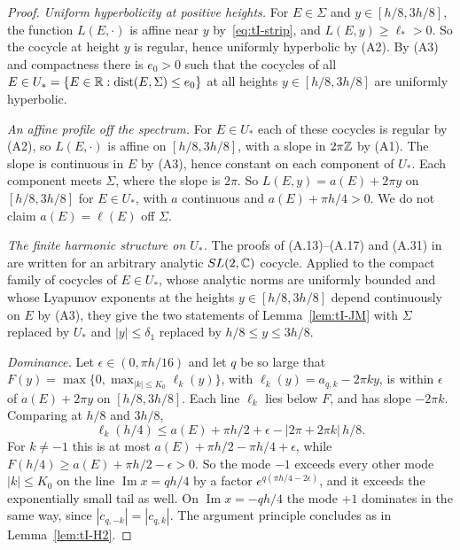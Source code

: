 \begin{proof}
\emph{Uniform hyperbolicity at positive heights.} For $E\in\Sigma$ and $y\in[h/8,3h/8]$, the function $L(E,\cdot)$ is affine near $y$ by~\eqref{eq:tI-strip}, and $L(E,y)\ge\ell_*>0$. So the cocycle at height $y$ is regular, hence uniformly hyperbolic by (A2). By (A3) and compactness there is $e_0>0$ such that the cocycles of all $E\in U_*=\{E\in\mathbb R:\operatorname{dist}(E,\Sigma)\le e_0\}$ at all heights $y\in[h/8,3h/8]$ are uniformly hyperbolic.

\emph{An affine profile off the spectrum.} For $E\in U_*$ each of these cocycles is regular by (A2), so $L(E,\cdot)$ is affine on $[h/8,3h/8]$, with a slope in $2\pi\mathbb Z$ by (A1). The slope is continuous in $E$ by (A3), hence constant on each component of $U_*$. Each component meets $\Sigma$, where the slope is $2\pi$. So $L(E,y)=a(E)+2\pi y$ on $[h/8,3h/8]$ for $E\in U_*$, with $a$ continuous and $a(E)+\pi h/4>0$. We do not claim $a(E)=\ell(E)$ off $\Sigma$.

\emph{The finite harmonic structure on $U_*$.} The proofs of (A.13)--(A.17) and (A.31) in~\cite[Appendix~A]{JitomirskayaMarx2012} are written for an arbitrary analytic $SL(2,\mathbb C)$ cocycle. Applied to the compact family of cocycles of $E\in U_*$, whose analytic norms are uniformly bounded and whose Lyapunov exponents at the heights $y\in[h/8,3h/8]$ depend continuously on $E$ by (A3), they give the two statements of Lemma~\ref{lem:tI-JM} with $\Sigma$ replaced by $U_*$ and $|y|\le\delta_1$ replaced by $h/8\le y\le3h/8$.

\emph{Dominance.} Let $\epsilon\in(0,\pi h/16)$ and let $q$ be so large that $F(y)=\max\{0,\max_{|k|\le K_0}\ell_k(y)\}$, with $\ell_k(y)=a_{q,k}-2\pi ky$, is within $\epsilon$ of $a(E)+2\pi y$ on $[h/8,3h/8]$. Each line $\ell_k$ lies below $F$, and has slope $-2\pi k$. Comparing at $h/8$ and $3h/8$,
\[
\ell_k(h/4)\le a(E)+\pi h/2+\epsilon-|2\pi+2\pi k|\,h/8.
\]
For $k\ne-1$ this is at most $a(E)+\pi h/2-\pi h/4+\epsilon$, while $F(h/4)\ge a(E)+\pi h/2-\epsilon>0$. So the mode $-1$ exceeds every other mode $|k|\le K_0$ on the line $\operatorname{Im}x=qh/4$ by a factor $e^{q(\pi h/4-2\epsilon)}$, and it exceeds the exponentially small tail as well. On $\operatorname{Im}x=-qh/4$ the mode $+1$ dominates in the same way, since $|c_{q,-k}|=|c_{q,k}|$. The argument principle concludes as in Lemma~\ref{lem:tI-H2}.
\end{proof}

